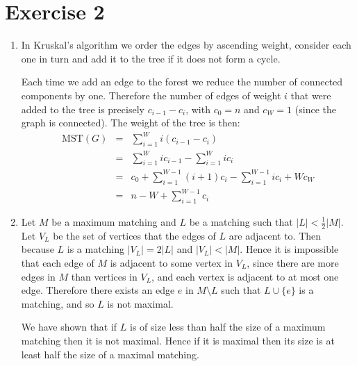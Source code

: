 \documentclass[11pt]{article} \usepackage{amssymb}
\newcommand{\half}{{\textstyle \frac12}}
\begin{document}
\section{Exercise 2}
\begin{enumerate}
  \item 

    In Kruskal's algorithm we order the edges by ascending weight, consider
    each one in turn and add it to the tree if it does not form a cycle.

    Each time we add an edge to the forest we reduce the number of 
    connected components by one. Therefore the number of edges of weight
    $i$ that were added to the tree is precisely $c_{i-1}-c_i$, with $c_0=n$ and
    $c_W=1$ (since the graph is connected).
    The weight of the tree is then:
    \begin{eqnarray*}
      \mbox{MST}(G)&=&\sum_{i=1}^Wi(c_{i-1}-c_i)
      \\ &=& \sum_{i=1}^Wic_{i-1}-\sum_{i=1}^Wic_i
      \\ &=& c_0+\sum_{i=1}^{W-1}(i+1)c_i-\sum_{i=1}^{W-1}ic_i+Wc_W
      \\ &=& n-W+\sum_{i=1}^{W-1}c_i
    \end{eqnarray*}
  \item
    Let $M$ be a maximum matching and $L$ be a matching such that
    $|L|<\half|M|$. Let $V_L$ be the set of vertices that the edges of $L$
    are adjacent to. Then because $L$ is a matching $|V_L|=2|L|$ and
    $|V_L|<|M|$. Hence it is impossible that each edge of $M$ is adjacent
    to some vertex in $V_L$, since there are more edges in $M$ than vertices
    in $V_L$, and each vertex is adjacent to at most one edge. 
    Therefore there 
    exists an edge $e$ in $M\setminus L$ such that $L\cup \{e\}$ is a matching,
    and so $L$ is not maximal. 

    We have shown that if $L$ is of size less than
    half the size of a maximum matching then it is not maximal. Hence if it is 
    maximal then its size is at least half the size of a maximal matching.


\end{enumerate}
\end{document}
